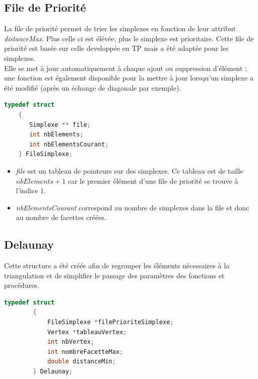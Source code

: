 \documentclass{article}
\begin{document}
    \subsection{File de Priorité}
    
    La file de priorité permet de trier les simplexes en fonction de leur attribut \textit{distanceMax}. Plus celle ci est élévée, plus le simplexe est prioritaire. Cette file de priorité est basée sur celle developpée en TP mais a été adaptée pour les simplexes.
    \\Elle se met à jour automatiquement à chaque ajout ou suppression d'élément ; une fonction est également disponible pour la mettre à jour lorsqu'un simplexe a été modifié (après un échange de diagonale par exemple).
    
    \begin{lstlisting}[caption={la structure FileSimplexe},language=C,label=structfile]
    typedef struct 
    {
       Simplexe ** file; 
       int nbElements;  
       int nbElementsCourant;
    } FileSimplexe;
    \end{lstlisting}
    \label{file}
    \begin{itemize}
    \item \textit{file} est un tableau de pointeurs sur des simplexes. Ce tableau est de taille $nbElements + 1$ car le premier élément d'une file de priorité se trouve à l'indice $1$.
    \item  \textit{nbElementsCourant} correspond au nombre de simplexes dans la file et donc au nombre de facettes créées.
    \end{itemize}

    \subsection{Delaunay}
    \label{structureDelaunay}
    
    Cette structure a été créée afin de regrouper les éléments nécessaires à la triangulation et de simplifier le passage des paramètres des fonctions et procédures.
    
    \begin{lstlisting}[caption={la structure Delaunay},language=C,label=structdelaunay]
        typedef struct 
        {
            FileSimplexe *filePrioriteSimplexe;
            Vertex *tableauVertex;
            int nbVertex;
            int nombreFacetteMax;
            double distanceMin;
        } Delaunay;
    \end{lstlisting}
    
\end{document}
